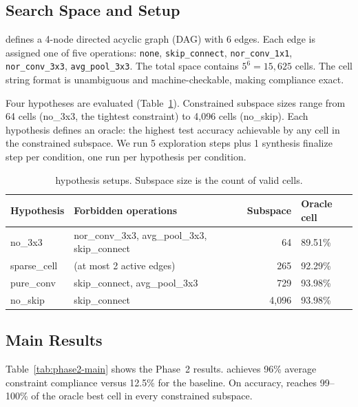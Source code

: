 \subsection{Search Space and Setup}
\label{sec:phase2-setup}

\nasbench{} defines a 4-node directed acyclic graph (DAG) with 6 edges. Each
edge is assigned one of five operations: \texttt{none}, \texttt{skip\_connect},
\texttt{nor\_conv\_1x1}, \texttt{nor\_conv\_3x3}, \texttt{avg\_pool\_3x3}.
The total space contains $5^6 = 15{,}625$ cells. The cell string format
is unambiguous and machine-checkable, making compliance exact.

Four hypotheses are evaluated (Table~\ref{tab:phase2-setup}). Constrained
subspace sizes range from 64 cells (no\_3x3, the tightest constraint) to
4,096 cells (no\_skip). Each hypothesis defines an oracle: the highest test
accuracy achievable by any cell in the constrained subspace. We run 5
exploration steps plus 1 synthesis finalize step per condition, one run per
hypothesis per condition.

\begin{table}[t]
\caption{\nasbench{} hypothesis setups. Subspace size is the count of valid cells.}
\label{tab:phase2-setup}
\begin{center}
\small
\begin{tabular}{llrp{4cm}}
\toprule
\textbf{Hypothesis} & \textbf{Forbidden operations} & \textbf{Subspace} & \textbf{Oracle cell} \\
\midrule
no\_3x3      & nor\_conv\_3x3, avg\_pool\_3x3, skip\_connect & 64       & 89.51\% \\
sparse\_cell & (at most 2 active edges)                      & 265      & 92.29\% \\
pure\_conv   & skip\_connect, avg\_pool\_3x3                 & 729      & 93.98\% \\
no\_skip     & skip\_connect                                 & 4{,}096  & 93.98\% \\
\bottomrule
\end{tabular}
\end{center}
\end{table}

\subsection{Main Results}
\label{sec:phase2-results}

Table~\ref{tab:phase2-main} shows the Phase~2 results. \haas{} achieves
96\% average constraint compliance versus 12.5\% for the baseline. On accuracy,
\haas{} reaches 99--100\% of the oracle best cell in every constrained subspace.

